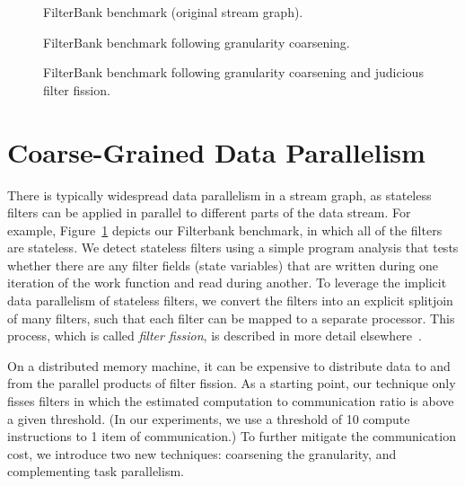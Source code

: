 \begin{figure}[t]
\begin{center}
\end{center}
\caption{FilterBank benchmark (original stream graph).\label{fig:filterbank-orig}}
\end{figure}

\begin{figure}[t]
\begin{center}
\end{center}
\caption{FilterBank benchmark following granularity
coarsening.\label{fig:filterbank-coarse}}
\end{figure}

\begin{figure}[t]
\begin{center}
\end{center}
\caption{FilterBank benchmark following granularity coarsening and
judicious filter fission.\label{fig:filterbank-dup}}
\end{figure}

\section{Coarse-Grained Data Parallelism}

There is typically widespread data parallelism in a stream graph, as
stateless filters can be applied in parallel to different parts of the
data stream.  For example, Figure~\ref{fig:filterbank-orig} depicts
our Filterbank benchmark, in which all of the filters are stateless.
We detect stateless filters using a simple program analysis that tests
whether there are any filter fields (state variables) that are written
during one iteration of the work function and read during another.  To
leverage the implicit data parallelism of stateless filters, we
convert the filters into an explicit splitjoin of many filters, such
that each filter can be mapped to a separate processor.  This process,
which is called {\it filter fission}, is described in more detail
elsewhere~\cite{gordon02asplos}.

On a distributed memory machine, it can be expensive to distribute
data to and from the parallel products of filter fission.  As a
starting point, our technique only fisses filters in which the
estimated computation to communication ratio is above a given
threshold.  (In our experiments, we use a threshold of 10 compute
instructions to 1 item of communication.)  To further mitigate the
communication cost, we introduce two new techniques: coarsening the
granularity, and complementing task parallelism.

